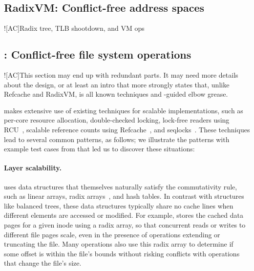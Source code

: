 

\subsection{RadixVM: Conflict-free address spaces}

\XXX![AC]{Radix tree, TLB shootdown, and VM ops}

\subsection{\fs: Conflict-free file system operations}

\XXX![AC]{This section may end up with redundant parts.  It may need
  more details about the design, or at least an intro that more
  strongly states that, unlike Refcache and RadixVM, \fs is all known
  techniques and \tool-guided elbow grease.}

\fs makes extensive use of existing techniques for scalable
implementations, such as per-core resource
allocation, double-checked locking, lock-free readers using
RCU~\cite{rcu:linux},
scalable reference counts using Refcache~\cite{clements:radixvm},
and seqlocks~\cite[\S6]{lameter:linuxsync}.  These techniques lead to
several common patterns, as follows; we illustrate the patterns with
example test cases from \tool{} that led us to discover these situations:


\paragraph{Layer scalability.}  \fs uses data structures that
themselves naturally satisfy the commutativity rule, such as linear
arrays, radix arrays~\cite{clements:radixvm}, and hash tables.  In
contrast with structures like balanced trees, these data
structures
typically share no cache lines when different elements are accessed
or modified.  For example, \fs stores the cached data pages for a given inode
using a radix array, so that concurrent reads or writes to different
file pages scale, even in the presence of operations
extending or truncating the file.
Many operations also use this radix array to determine if some offset
is within the file's bounds without risking conflicts with operations
that change the file's size.



